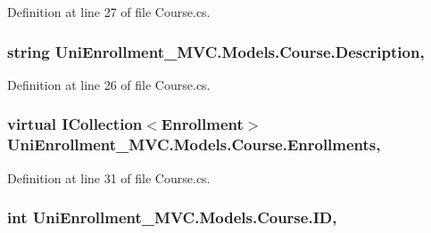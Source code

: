 Definition at line 27 of file Course.\+cs.

\subsubsection[{\texorpdfstring{Description}{Description}}]{\setlength{\rightskip}{0pt plus 5cm}string Uni\+Enrollment\+\_\+\+M\+V\+C.\+Models.\+Course.\+Description\hspace{0.3cm}{\ttfamily [get]}, {\ttfamily [set]}}\hypertarget{class_uni_enrollment___m_v_c_1_1_models_1_1_course_a9d07427b616b5609d8ae74e155c6cb2d}{}\label{class_uni_enrollment___m_v_c_1_1_models_1_1_course_a9d07427b616b5609d8ae74e155c6cb2d}


Definition at line 26 of file Course.\+cs.

\subsubsection[{\texorpdfstring{Enrollments}{Enrollments}}]{\setlength{\rightskip}{0pt plus 5cm}virtual I\+Collection$<${\bf Enrollment}$>$ Uni\+Enrollment\+\_\+\+M\+V\+C.\+Models.\+Course.\+Enrollments\hspace{0.3cm}{\ttfamily [get]}, {\ttfamily [set]}}\hypertarget{class_uni_enrollment___m_v_c_1_1_models_1_1_course_aea0587dad0db95d55ab18c7dce4caf43}{}\label{class_uni_enrollment___m_v_c_1_1_models_1_1_course_aea0587dad0db95d55ab18c7dce4caf43}


Definition at line 31 of file Course.\+cs.

\subsubsection[{\texorpdfstring{ID}{ID}}]{\setlength{\rightskip}{0pt plus 5cm}int Uni\+Enrollment\+\_\+\+M\+V\+C.\+Models.\+Course.\+ID\hspace{0.3cm}{\ttfamily [get]}, {\ttfamily [set]}}\hypertarget{class_uni_enrollment___m_v_c_1_1_models_1_1_course_ace95aa2f83a31987a37f6daf622cf0ec}{}\label{class_uni_enrollment___m_v_c_1_1_models_1_1_course_ace95aa2f83a31987a37f6daf622cf0ec}


